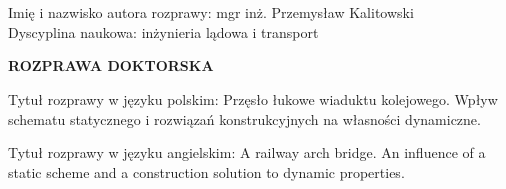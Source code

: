 \begin{titlepage}
	\begin{figure}
		\hfill
		
	\end{figure}
	
	
	
	
	\begin{myfont}
		
		\footnotesize
		\noindent
		\\ \\
		Imię i nazwisko autora rozprawy: mgr inż. Przemysław Kalitowski \\
		Dyscyplina naukowa: inżynieria lądowa i transport
		\vspace{3.5cm}
		
		\normalsize
		\noindent
		\textbf{ROZPRAWA DOKTORSKA}
		\vspace{3.5cm}
		
		\footnotesize
		\noindent
		Tytuł rozprawy w języku polskim: Przęsło łukowe wiaduktu kolejowego. Wpływ schematu statycznego i rozwiązań konstrukcyjnych na własności dynamiczne.
		
		\vspace{0.5cm}
		\noindent
		Tytuł rozprawy w języku angielskim: A railway arch bridge. An influence of a static scheme and a construction solution to dynamic properties.
		\vspace{2cm}		
		

\end{myfont}
\end{titlepage}
